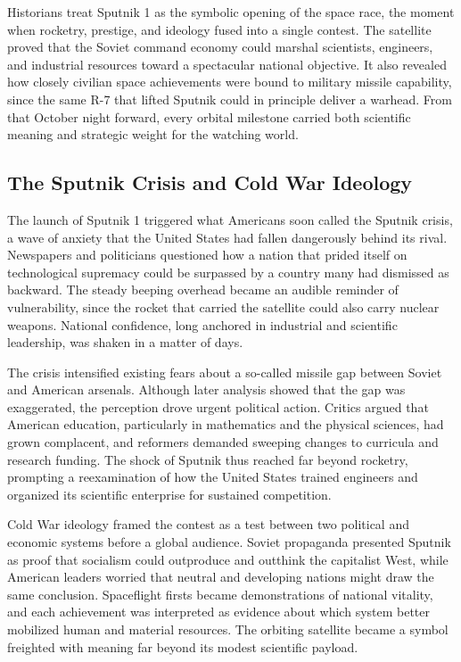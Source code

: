 Historians treat Sputnik 1 as the symbolic opening of the space race, the moment when rocketry, prestige, and ideology fused into a single contest. The satellite proved that the Soviet command economy could marshal scientists, engineers, and industrial resources toward a spectacular national objective. It also revealed how closely civilian space achievements were bound to military missile capability, since the same R-7 that lifted Sputnik could in principle deliver a warhead. From that October night forward, every orbital milestone carried both scientific meaning and strategic weight for the watching world. \cite{siddiqi2010} \cite{mcdougall1985}

\subsection{The Sputnik Crisis and Cold War Ideology}
The launch of Sputnik 1 triggered what Americans soon called the Sputnik crisis, a wave of anxiety that the United States had fallen dangerously behind its rival. Newspapers and politicians questioned how a nation that prided itself on technological supremacy could be surpassed by a country many had dismissed as backward. The steady beeping overhead became an audible reminder of vulnerability, since the rocket that carried the satellite could also carry nuclear weapons. National confidence, long anchored in industrial and scientific leadership, was shaken in a matter of days.

The crisis intensified existing fears about a so-called missile gap between Soviet and American arsenals. Although later analysis showed that the gap was exaggerated, the perception drove urgent political action. Critics argued that American education, particularly in mathematics and the physical sciences, had grown complacent, and reformers demanded sweeping changes to curricula and research funding. The shock of Sputnik thus reached far beyond rocketry, prompting a reexamination of how the United States trained engineers and organized its scientific enterprise for sustained competition.

Cold War ideology framed the contest as a test between two political and economic systems before a global audience. Soviet propaganda presented Sputnik as proof that socialism could outproduce and outthink the capitalist West, while American leaders worried that neutral and developing nations might draw the same conclusion. Spaceflight firsts became demonstrations of national vitality, and each achievement was interpreted as evidence about which system better mobilized human and material resources. The orbiting satellite became a symbol freighted with meaning far beyond its modest scientific payload.

